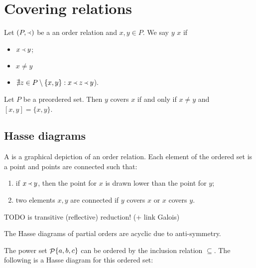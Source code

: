 \section{Covering relations}
\begin{definition}
Let $(P,\Yleft)$ be a an order relation and $x,y\in P$. We say $y$  $x$ if
\begin{itemize}
\item $x\Yleft y$;
\item $x\neq y$
\item $\nexists z\in P\setminus\{x,y\}: x\Yleft z \Yleft y$).
\end{itemize}
\end{definition}

\begin{lemma}
Let $P$ be a preordered set. Then $y$ covers $x$ \textup{if and only if} $x\neq y$ and $[x,y] = \{x,y\}$.
\end{lemma}

\subsection{Hasse diagrams}
A  is a graphical depiction of an order relation. Each element of the ordered set is a point and points are connected such that:
\begin{enumerate}
\item if $x \Yleft y$, then the point for $x$ is drawn lower than the point for $y$;
\item two elements $x,y$ are connected if $y$ covers $x$ or $x$ covers $y$.
\end{enumerate}

TODO is transitive (reflective) reduction! (+ link Galois)

\begin{lemma}
The Hasse diagrams of partial orders are acyclic due to anti-symmetry.
\end{lemma}

\begin{example}
The power set $\mathop{\mathcal{P}}\{a,b,c\}$ can be ordered by the inclusion relation $\subseteq$. The following is a Hasse diagram for this ordered set:
\begin{center}
\end{center}
\end{example}


